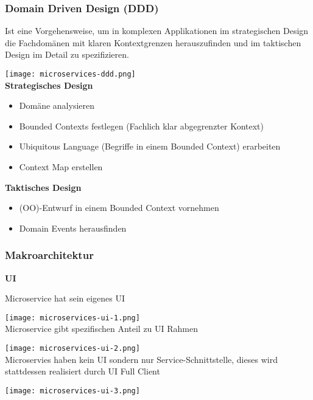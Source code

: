 \subsubsection{Domain Driven Design (DDD)}

Ist eine Vorgehensweise, um in komplexen Applikationen im strategischen Design die Fachdomänen mit klaren Kontextgrenzen herauszufinden und im taktischen Design im Detail zu spezifizieren.

\texttt{[image: microservices-ddd.png]} \\

\textbf{Strategisches Design}

\begin{itemize}
    \item Domäne analysieren
    \item Bounded Contexts festlegen (Fachlich klar abgegrenzter Kontext)
    \item Ubiquitous Language (Begriffe in einem Bounded Context) erarbeiten
    \item Context Map erstellen
\end{itemize}
\vspace{10pt}
\textbf{Taktisches Design}

\begin{itemize}
    \item (OO)-Entwurf in einem Bounded Context vornehmen
    \item Domain Events herausfinden
\end{itemize}

\columnbreak
\subsubsection{Makroarchitektur}

\textbf{UI}

Microservice hat sein eigenes UI

\texttt{[image: microservices-ui-1.png]} \\

Microservice gibt spezifischen Anteil zu UI Rahmen

\texttt{[image: microservices-ui-2.png]} \\

Microservies haben kein UI sondern nur Service-Schnittstelle, dieses wird stattdessen realisiert durch UI Full Client

\texttt{[image: microservices-ui-3.png]}


